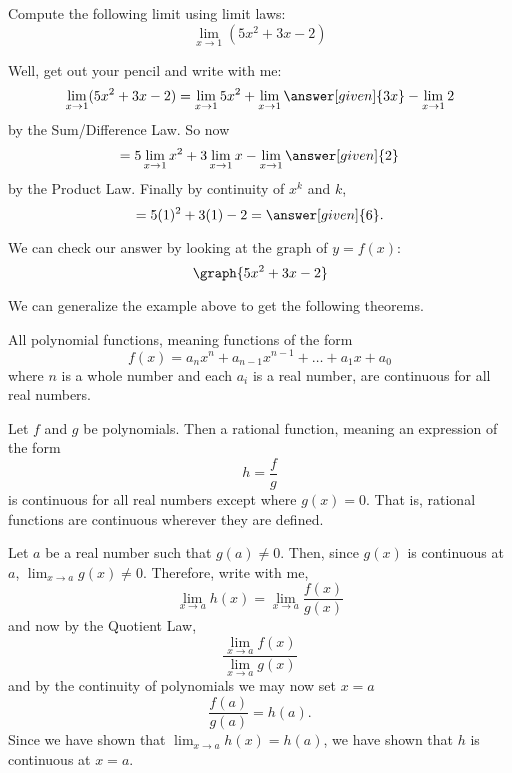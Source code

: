 \documentclass{ximera}
\begin{document}
\begin{example}
  Compute the following limit using limit laws:
  \[
  \lim_{x\to 1}(5x^2+3x-2)
  \]
\begin{explanation}
  Well, get out your pencil and write with me:
  \[
  \lim_{x\to 1} (5x^2+3x-2) = \lim_{x\to 1} 5x^2 + \lim_{x\to 1} \answer[given]{3x} - \lim_{x\to 1}2
  \]
  by the Sum/Difference Law. So now
  \[
  = 5\lim_{x\to 1} x^2 + 3\lim_{x\to 1} x - \lim_{x\to 1}\answer[given]{2}
  \]
  by the Product Law. Finally by continuity of $x^k$ and $k$,
  \[
  = 5(1)^2 + 3(1) - 2 =\answer[given]{6}.
  \]
  \begin{onlineOnly}
    We can check our answer by looking at the graph of $y=f(x)$:
    \[
    \graph{5x^2+3x-2}
    \]
  \end{onlineOnly}
\end{explanation}  
\end{example}

We can generalize the example above to get the following theorems.

\begin{theorem}
  All polynomial functions, meaning functions of the form
  \[
  f(x) = a_nx^n + a_{n-1}x^{n-1} + \dots + a_1 x + a_0
  \]
  where $n$ is a whole number and each $a_i$ is a real number, are
  continuous for all real numbers.
\end{theorem}

\begin{theorem}
  Let $f$ and $g$ be polynomials.  Then a rational function, meaning an
  expression of the form
  \[
  h=\frac{f}{g}
  \]
  is continuous for all real numbers except where $g(x)=0$.  That is,
  rational functions are continuous wherever they are defined.
\begin{explanation}
      Let $a$ be a real number such that $g(a)\neq 0$.  Then, since
      $g(x)$ is continuous at $a$, $\lim_{x\to a} g(x) \neq 0$.
      Therefore, write with me, 
      \[
      \lim_{x \to a} h(x) = \lim_{x\to a} \frac{f(x)}{g(x)}
      \]
      and now by the Quotient Law, 
      \[
      \frac{\lim_{x\to a} f(x)}{ \lim_{x\to a} g(x)}
      \]
      and by the continuity of polynomials we may now set $x=a$
      \[
      \frac{f(a)}{g(a)}=h(a).
      \]
      Since we have shown that $\lim_{x\to a} h(x) = h(a)$, we have
      shown that $h$ is continuous at $x=a$.
\end{explanation}
\end{theorem}
\end{document}
